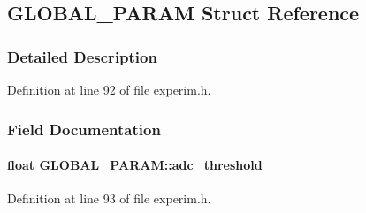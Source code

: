 \subsection{GLOBAL\_\-PARAM Struct Reference}
\label{structGLOBAL__PARAM}


\subsubsection{Detailed Description}


Definition at line 92 of file experim.h.

\subsubsection{Field Documentation}
\paragraph[{adc\_\-threshold}]{\setlength{\rightskip}{0pt plus 5cm}float {\bf GLOBAL\_\-PARAM::adc\_\-threshold}}\hfill\label{structGLOBAL__PARAM_aa4d82c9ec46e35b2d968bf3a0203f737}


Definition at line 93 of file experim.h.
